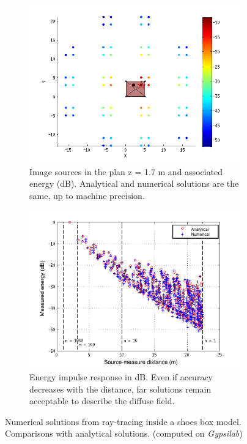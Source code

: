 \documentclass[AMA,STIX1COL]{WileyNJD-v2}
\begin{document}
\begin{figure}[t]
\centering
	\begin{subfigure}{0.47\textwidth}
		\includegraphics[width=\linewidth]{sourcesImages}
		\caption{Image sources in the plan z = 1.7 m and associated energy (dB). Analytical and numerical solutions are the same, up to machine precision.}
		\label{sourcesImages}
	\end{subfigure}
	\quad
	\begin{subfigure}{0.47\textwidth}
		\includegraphics[width=\linewidth]{boite}
		\caption{Energy impulse response in dB. Even if accuracy decreases with the distance, far solutions remain acceptable to describe the diffuse field. }
		\label{boite}
	\end{subfigure}
	\caption{Numerical solutions from ray-tracing inside a shoes box model. Comparisons with analytical solutions. (computed on \textit{Gypsilab})}
\end{figure}
\end{document}
